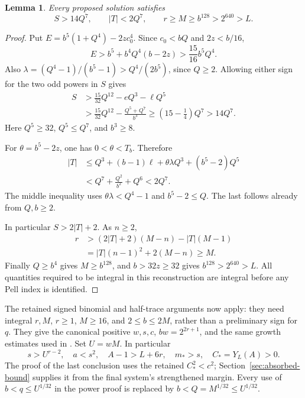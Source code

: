 \documentclass[11pt]{article}
\newtheorem{lemma}[theorem]{Lemma}
\begin{document}
\begin{lemma}\label{lem:prefix}
Every proposed solution satisfies
\[
 S>14Q^7,\qquad |T|<2Q^7,\qquad
 r\ge M\ge b^{128}>2^{640}>L.
\]
\end{lemma}
\begin{proof}
Put \(E=b^5(1+Q^4)-2zc_0^4\). Since \(c_0<bQ\) and
\(2z<b/16\),
\[
 E>b^5+b^4Q^4(b-2z)>\frac{15}{16}b^5Q^4.
\]
Also
\(\lambda=(Q^4-1)/(b^5-1)>Q^4/(2b^5)\), since \(Q\ge2\).
Allowing either sign for the two odd powers in \(S\) gives
\[
 \begin{split}
 S&>\frac{15}{32}Q^{12}-eQ^3-\ell Q^5\\
  &>\frac{15}{32}Q^{12}-\frac{Q^5+Q^7}{b^3}
   \ge\left(15-\frac14\right)Q^7>14Q^7.
 \end{split}
\]
Here \(Q^5\ge32\), \(Q^5\le Q^7\), and \(b^3\ge8\).

For \(\theta=b^5-2z\), one has \(0<\theta<T_b\).
Therefore
\[
 \begin{split}
 |T|&\le Q^3+(b-1)\ell+\theta\lambda Q^3+(b^5-2)Q^5\\
     &<Q^7+\frac{Q^2}{b^2}+Q^6<2Q^7.
 \end{split}
\]
The middle inequality uses \(\theta\lambda<Q^4-1\) and
\(b^5-2\le Q\). The last follows already from \(Q,b\ge2\).

In particular \(S>2|T|+2\). As \(n\ge2\),
\[
 \begin{split}
 r&>(2|T|+2)(M-n)-|T|(M-1)\\
  &=|T|(n-1)^2+2(M-n)\ge M.
 \end{split}
\]
Finally \(Q\ge b^4\) gives \(M\ge b^{128}\), and
\(b>32z\ge32\) gives \(b^{128}>2^{640}>L\).
All quantities required to be integral in this reconstruction are
integral before any Pell index is identified.
\end{proof}

The retained signed binomial and half-trace arguments now apply:
they need integral \(r,M\), \(r\ge1\), \(M\ge16\), and
\(2\le b\le2M\), rather than a preliminary sign for \(q\).
They give the canonical positive \(w,s,c\),
\(bw=2^{2r+1}\), and the same growth estimates used in
\cite{Power}. Set \(U=wM\). In particular
\[
 s>U^{r-2},\quad a<s^2,\quad A-1>L+6r,\quad m_*>s,
 \quad C_*=Y_L(A)>0.
\]
The proof of the last conclusion uses the retained
\(C_*^2<c^2\); Section~\ref{sec:absorbed-bound} supplies it
from the final system's strengthened margin. Every use of
\(b<q\le U^{1/32}\) in the power proof is replaced by
\(b<Q=M^{1/32}\le U^{1/32}\).
\end{document}
